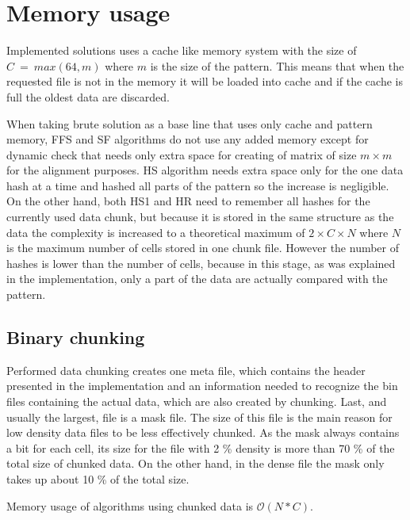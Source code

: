 \section{Memory usage} \label{memoryuse}
Implemented solutions uses a cache like memory system with the size of $C~=~max(64, m)$ where $m$ is the size of the pattern. This means that when the requested file is not in the memory it will be loaded into cache and if the cache is full the oldest data are discarded. 

When taking brute solution as a base line that uses only cache and pattern memory, FFS and SF algorithms do not use any added memory except for dynamic check that needs only extra space for creating of matrix of size $m\times m$ for the alignment purposes. HS algorithm needs extra space only for the one data hash at a time and hashed all parts of the pattern so the increase is negligible. On the other hand, both HS1 and HR need to remember all hashes for the currently used data chunk, but because it is stored in the same structure as the data the complexity is increased to a theoretical maximum of $2\times C \times N$ where $N$ is the maximum number of cells stored in one chunk file. However the number of hashes is lower than the number of cells, because in this stage, as was explained in the implementation, only a part of the data are actually compared with the pattern.

\subsection{Binary chunking}
Performed data chunking creates one meta file, which contains the header presented in the implementation and an information needed to recognize the bin files containing the actual data, which are also created by chunking. Last, and usually the largest, file is a mask file. The size of this file is the main reason for low density data files to be less effectively chunked. As the mask always contains a bit for each cell, its size for the file with 2 \% density is more than 70 \% of the total size of chunked data. On the other hand, in the dense file the mask only takes up about 10 \% of the total size. 

Memory usage of algorithms using chunked data is $\mathcal{O}(N*C)$.